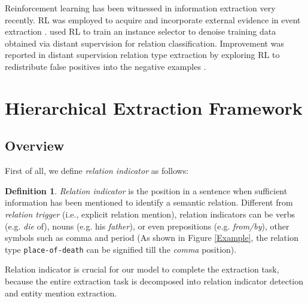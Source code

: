 \documentclass[letterpaper]{article} %
\theoremstyle{definition}
\newtheorem{defn}{Definition}[]
\begin{document}
Reinforcement learning has been witnessed in information extraction very recently. RL was employed to acquire and incorporate external evidence in event extraction \cite{narasimhan2016improving}. \citeauthor{feng2018reinforcement}  used RL to train an instance selector to denoise training data obtained via distant supervision for relation classification.
Improvement was reported in distant supervision relation type extraction by exploring RL to redistribute false positives into the negative examples \cite{qin2018robust}.

\section{Hierarchical Extraction Framework}


\subsection{Overview}

First of all, we define \textit{relation indicator} as follows:
\begin{defn}
    \textit{Relation indicator} is the position in a sentence when sufficient information has been mentioned to identify a semantic relation. Different from \textit{relation trigger} (i.e., explicit relation mention), relation indicators can be verbs (e.g. \textit{die} of), nouns (e.g. his \textit{father}), or even prepositions (e.g. \textit{from/by}), other symbols such as comma and period (As shown in Figure \ref{Example}, the relation type \texttt{place-of-death} can be signified till the {\it comma} position).
\label{define:relation_indicator}  %
\end{defn}
Relation indicator is crucial for our model to complete the extraction task, because the entire extraction task is decomposed into relation indicator detection and entity mention extraction.
\end{document}
